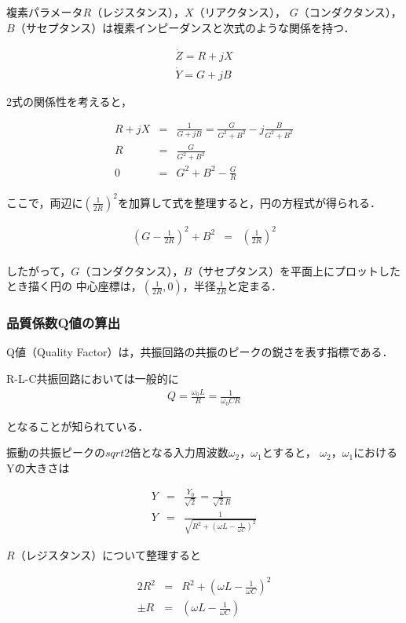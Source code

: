 \documentclass[dvipdfmx,titlepage,a4j]{jsarticle}  %
\numberwithin{equation}{section}
\begin{document}
複素パラメータ$R$（レジスタンス），$X$（リアクタンス），
$G$（コンダクタンス），$B$（サセプタンス）は複素インピーダンスと次式のような関係を持つ．

\begin{eqnarray}
  \dot{Z} = R + jX \\
  \dot{Y} = G + jB
\end{eqnarray}

2式の関係性を考えると，

\begin{eqnarray}
  R + jX &=& \frac{1}{G + jB} = \frac{G}{G^2 + B^2} -j\frac{B}{G^2 + B^2} \\
  R &=& \frac{G}{G^2 + B^2} \\
  0 &=& G^2 + B^2 - \frac{G}{R}
\end{eqnarray}

ここで，両辺に$(\frac{1}{2R})^2$を加算して式を整理すると，円の方程式が得られる．

\begin{eqnarray}
  (G - \frac{1}{2R})^2 + B^2 &=& (\frac{1}{2R})^2 \\
\end{eqnarray}

したがって，$G$（コンダクタンス），$B$（サセプタンス）を平面上にプロットしたとき描く円の
中心座標は，$(\frac{1}{2R}, 0)$，半径$\frac{1}{2R}$と定まる．

\subsubsection{品質係数Q値の算出}
Q値（Quality Factor）は，共振回路の共振のピークの鋭さを表す指標である．

R-L-C共振回路においては一般的に
\begin{eqnarray}
  Q = \frac{\omega_0 L}{R} = \frac{1}{\omega_0 CR}
\end{eqnarray}

となることが知られている．

振動の共振ピークの$sqrt{2}$倍となる入力周波数$\omega_2$，$\omega_1$とすると，
$\omega_2$，$\omega_1$におけるYの大きさは

\begin{eqnarray}
  Y &=& \frac{Y_0}{\sqrt{2}} = \frac{1}{\sqrt{2}R} \\
  Y &=& \frac{1}{\sqrt{R^2 + (\omega L - \frac{1}{\omega C})^2}}
\end{eqnarray}

$R$（レジスタンス）について整理すると

\begin{eqnarray}
  2R^2 &=& R^2 + (\omega L - \frac{1}{\omega C})^2 \\
  \pm R &=& (\omega L - \frac{1}{\omega C})
\end{eqnarray}
\end{document}
